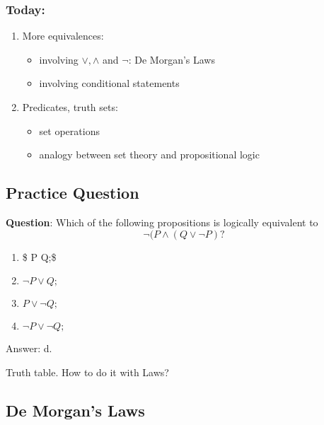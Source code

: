 \documentclass[11pt]{article}
\providecommand{\tightlist}{%
      \setlength{\itemsep}{0pt}\setlength{\parskip}{0pt}}
\begin{document}
    \subsubsection{Today:}\label{today}

\begin{enumerate}
\def\labelenumi{\arabic{enumi}.}
\tightlist
\item
  More equivalences:

  \begin{itemize}
  \tightlist
  \item
    involving \(\lor, \land\) and \(\neg\): De Morgan's Laws
  \item
    involving conditional statements
  \end{itemize}
\item
  Predicates, truth sets:

  \begin{itemize}
  \tightlist
  \item
    set operations
  \item
    analogy between set theory and propositional logic
  \end{itemize}
\end{enumerate}

    \subsection{Practice Question}\label{practice-question}

\textbf{Question}: Which of the following propositions is logically
equivalent to \[
\neg(P \land(Q \lor \neg P)?
\]

\begin{enumerate}
\def\labelenumi{\alph{enumi}.}
\tightlist
\item
  \$ P \lor Q;\$\\
\item
  \(\neg P \lor Q;\)\\
\item
  \(P \lor \neg Q;\)\\
\item
  \(\neg P \lor \neg Q;\)
\end{enumerate}

    Answer: d.

Truth table. How to do it with Laws?

    \subsection{De Morgan's Laws}\label{de-morgans-laws}
\end{document}
